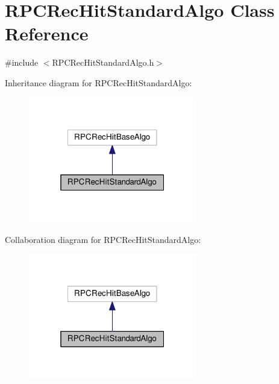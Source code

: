 \hypertarget{classRPCRecHitStandardAlgo}{\section{R\-P\-C\-Rec\-Hit\-Standard\-Algo Class Reference}
\label{classRPCRecHitStandardAlgo}
}


{\ttfamily \#include $<$R\-P\-C\-Rec\-Hit\-Standard\-Algo.\-h$>$}



Inheritance diagram for R\-P\-C\-Rec\-Hit\-Standard\-Algo\-:
\nopagebreak
\begin{figure}[H]
\begin{center}
\leavevmode
\includegraphics[width=208pt]{classRPCRecHitStandardAlgo__inherit__graph}
\end{center}
\end{figure}


Collaboration diagram for R\-P\-C\-Rec\-Hit\-Standard\-Algo\-:
\nopagebreak
\begin{figure}[H]
\begin{center}
\leavevmode
\includegraphics[width=208pt]{classRPCRecHitStandardAlgo__coll__graph}
\end{center}
\end{figure}
